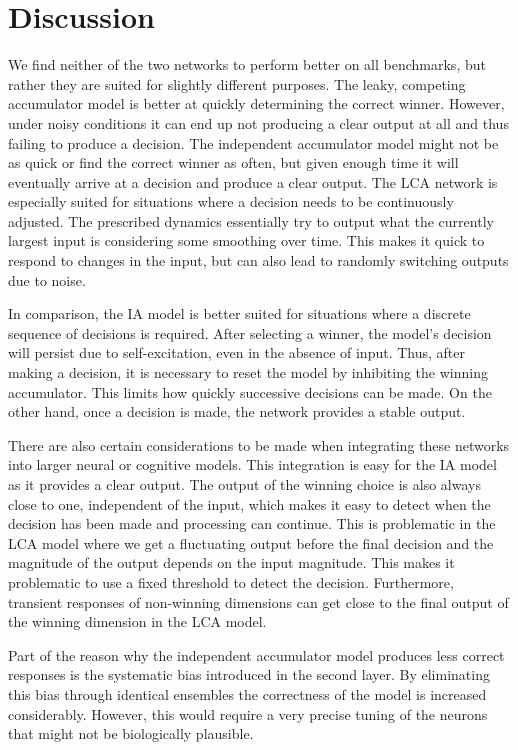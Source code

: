 \documentclass[10pt,letterpaper]{article}
\begin{document}
\section{Discussion}
We find neither of the two networks to perform better on all benchmarks, but rather 
they are suited for slightly different purposes. The leaky, competing accumulator 
model is better at quickly determining the correct winner. However, under noisy 
conditions it can end up not producing a clear output at all and thus failing to 
produce a decision.  The independent accumulator model might not be as quick or 
find the correct winner as often, but given enough time it will eventually 
arrive at a decision and produce a clear output.
The LCA network is especially suited for situations where a decision needs to be 
continuously adjusted. The prescribed dynamics essentially try to output what 
the currently largest input is considering some smoothing over time. This makes 
it quick to respond to changes in the input, but can also lead to randomly 
switching outputs due to noise.

In comparison, the IA model is better suited for 
situations where a discrete sequence of decisions is required.  After selecting a winner, the model's decision will persist due to self-excitation, even in the absence of input. Thus, after making a decision, it is necessary to reset the model by inhibiting the winning accumulator. This limits how quickly successive decisions can be made.
On the other hand, once a decision is made, the network provides a stable output.

There are also certain considerations to be made when integrating these networks 
into larger neural or cognitive models. This integration is easy for the IA 
model as it provides a clear output. The output of the winning choice is also 
always close to one, independent of the input, which makes it easy to detect 
when the decision has been made and processing can continue. This is problematic 
in the LCA model where we get a fluctuating output before the final decision and 
the magnitude of the output depends on the input magnitude. This makes it 
problematic to use a fixed threshold to detect the decision. Furthermore, 
transient responses of non-winning dimensions can get close to the final output 
of the winning dimension in the LCA model.

Part of the reason why the independent accumulator model produces less correct 
responses is the systematic bias introduced in the second layer. By eliminating 
this bias through identical ensembles the correctness of the model is increased 
considerably. However, this would require a very precise tuning of the neurons 
that might not be biologically plausible.
\end{document}
